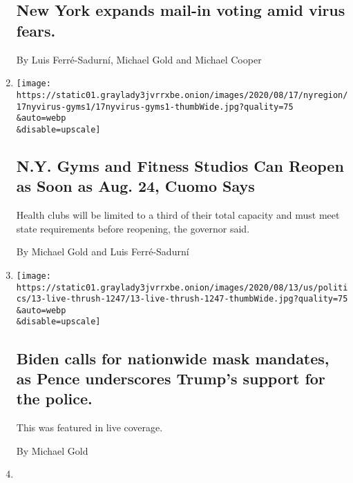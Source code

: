 \begin{enumerate}
{  \subsection{New York expands mail-in voting amid virus
  fears.}\label{new-york-expands-mail-in-voting-amid-virus-fears}}

  By Luis Ferré-Sadurní, Michael Gold and Michael Cooper
\item
  \href{/2020/08/17/nyregion/nyc-gyms-reopening.html}{}

  \texttt{[image: https://static01.graylady3jvrrxbe.onion/images/2020/08/17/nyregion/17nyvirus-gyms1/17nyvirus-gyms1-thumbWide.jpg?quality=75\\\&auto=webp\\\&disable=upscale]}

  \hypertarget{ny-gyms-and-fitness-studios-can-reopen-as-soon-as-aug-24-cuomo-says}{%
  \subsection{N.Y. Gyms and Fitness Studios Can Reopen as Soon as Aug.
  24, Cuomo
  Says}\label{ny-gyms-and-fitness-studios-can-reopen-as-soon-as-aug-24-cuomo-says}}

  Health clubs will be limited to a third of their total capacity and
  must meet state requirements before reopening, the governor said.

  By Michael Gold and Luis Ferré-Sadurní
\item
  \href{/live/2020/08/13/us/biden-vs-trump/biden-calls-for-nationwide-mask-mandates-as-pence-underscores-trumps-support-for-the-police}{}

  \texttt{[image: https://static01.graylady3jvrrxbe.onion/images/2020/08/13/us/politics/13-live-thrush-1247/13-live-thrush-1247-thumbWide.jpg?quality=75\\\&auto=webp\\\&disable=upscale]}

  \hypertarget{biden-calls-for-nationwide-mask-mandates-as-pence-underscores-trumps-support-for-the-police}{%
  \subsection{Biden calls for nationwide mask mandates, as Pence
  underscores Trump's support for the
  police.}\label{biden-calls-for-nationwide-mask-mandates-as-pence-underscores-trumps-support-for-the-police}}

  This was featured in live coverage.

  By Michael Gold
\item
  \href{/live/2020/08/12/us/biden-vs-trump/harris-and-biden-spoke-of-their-shared-connection-to-beau-biden}{}


\end{enumerate}
